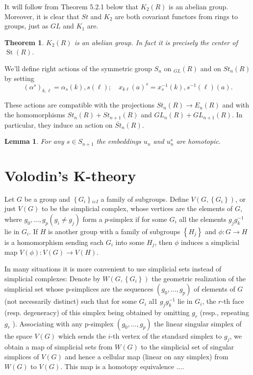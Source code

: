 \documentclass{book}
\newtheorem{theo}{Theorem}
\newtheorem{lemm}{Lemma}
\begin{document}
It will follow from Theorem 5.2.1 below that $K_2(R)$ is an abelian group. Moreover, it is clear that $S t$ and $K_2$ are both covariant functors from rings to groups, just as $G L$ and $K_1$ are.

\begin{theo}
$K_2(R)$ is an abelian group. In fact it is precisely the center of $\operatorname{St}(R)$.
\end{theo}

We'll define right actions of the symmetric group $S_n$ on ${ }_{G L}(R)$ and on $S t_n(R)$ by setting
$$
\left(\alpha^s\right)_{k, \ell}=\alpha_s(k), s(\ell) ; \quad x_{k \ell}(a)^s=x_s^{-1}(k), s^{-1}(\ell)(a) .
$$

These actions are compatible with the projections $S t_n(R) \rightarrow E_n(R)$ and with the homomorphisms $S t_n(R)+S t_{n+1}(R)$ and $G L_n(R)+G L_{n+1}(R)$. In particular, they induce an action on $\overline{S t}_n(R)$.

\begin{lemm}
    For any $s \in S_{n+1}$ the embeddings $u_n$ and $u_n^s$ are homotopic.
\end{lemm} 



\section{Volodin's K-theory}

Let $G$ be a group and $\left\{G_i\right\}{ }_{i \varepsilon I}$ a family of subgroups. Define $V\left(G,\left\{G_i\right\}\right)$, or just $V(G)$ to be the simplicial complex, whose vertices are the elements of $G$, where $g_0, \ldots, g_p\left(g_i \neq g_j\right)$ form a $p$-simplex if for some $G_i$ all the elements $g_j g_k^{-1}$ lie in $G_i$. If $H$ is another group with a family of subgroups $\left\{H_j\right\}$ and $\phi: G \rightarrow H$ is a homomorphism sending each $G_i$ into some $H_j$, then $\phi$ induces a simplicial map $V(\phi): V(G) \rightarrow V(H)$.

In many situations it is more convenient to use simplicial sets instead of simplicial complexes: Denote by $W\left(G,\left\{G_i\right\}\right)$ the geometric realization of the simplicial set whose p-simplices are the sequences $\left(g_0, \ldots, g_p\right)$ of elements of $G$ (not necessarily distinct) such that for some $G_i$ al1 $g_j g_k^{-1}$ lie in $G_i$, the $r$-th face (resp. degeneracy) of this simplex being obtained by omitting $g_r$ (resp., repeating $g_r$ ). Associating with any p-simplex $\left(g_0, \ldots, g_p\right)$ the linear singular simplex of the space $V(G)$ which sends the $i$-th vertex of the standard simplex to $g_j$, we obtain a map of simplicial sets from $W(G)$ to the simplicial set of singular simplices of $V(G)$ and hence a cellular map (linear on any simplex) from $W(G)$ to $V(G)$. This map is a homotopy equivalence .... %
\end{document}
